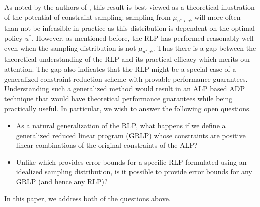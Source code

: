 As noted by the authors of \cite{CS}, this result is best viewed as a
	theoretical illustration of the potential of constraint sampling:
	sampling from $\mu_{u^*,c,\psi}$ will more often than not be infeasible in practice
	as this distribution is dependent on the optimal policy $u^*$.
However, as mentioned before, the RLP has performed reasonably well 
	even when the sampling distribution is not $\mu_{u^*,\psi}$. 
Thus there is a gap between the theoretical understanding of the RLP 
	and its practical efficacy which merits our attention. 
The gap also indicates that the RLP might be a special case 
	of a generalized constraint reduction scheme with provable performance guarantees. 
Understanding such a generalized method would result in an ALP based ADP technique 
	that would have theoretical performance guarantees while being practically useful. 
In particular, we wish to answer the following open questions.
\begin{itemize}
\item  As a natural generalization of the RLP, what happens if we define a generalized reduced linear program (GRLP) whose constraints are positive linear combinations of the original constraints of the ALP?
\item Unlike \cite{CS} which provides error bounds for a specific RLP formulated using an idealized sampling distribution, is it possible to provide error bounds for any GRLP (and hence any RLP)?
\end{itemize}
In this paper, we address both of the questions above.
